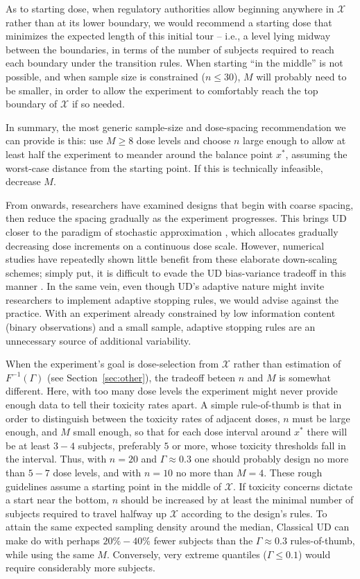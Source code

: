 As to starting dose, when regulatory authorities allow beginning anywhere in $\mathcal{X}$ rather than at its lower boundary, we would recommend a starting dose that minimizes the expected length of this initial tour -- i.e., a level lying midway between the boundaries, in terms of the number of subjects required to reach each boundary under the transition rules. When starting ``in the middle'' is not possible, and when sample size is constrained ($n\leq 30$), $M$ will probably need to be smaller, in order to allow the experiment to comfortably reach the top boundary of $\mathcal{X}$ if so needed.

In summary, the most generic sample-size and dose-spacing recommendation we can provide is this: use $M\geq 8$ dose levels and choose $n$ large enough to allow at least half the experiment to meander around the balance point $x^*$, assuming the worst-case distance from the starting point. If this is technically infeasible, decrease $M$.

From \cite{Weth:Sequ:1963} onwards, researchers have examined designs that begin with coarse spacing, then reduce the spacing gradually as the experiment progresses. This brings UD closer to the paradigm of stochastic approximation \citep{Robb:Monro:Asto:1951}, which allocates gradually decreasing dose increments on a continuous dose scale. However, numerical studies have repeatedly shown little benefit from these elaborate down-scaling schemes; simply put, it is difficult to evade the UD bias-variance tradeoff in this manner \citep{Garc:Pere:Forc:1998}. In the same vein, even though UD's adaptive nature might invite researchers to implement adaptive stopping rules, we would advise against the practice. With an experiment already constrained by low information content (binary observations) and a small sample, adaptive stopping rules are an unnecessary source of additional variability.

When the experiment's goal is dose-selection from $\mathcal{X}$ rather than estimation of $F^{-1}(\Gamma)$ (see Section~\ref{sec:other}), the tradeoff beteen $n$ and $M$ is somewhat different. Here, with too many dose levels the experiment might never provide enough data to tell their toxicity rates apart. A simple rule-of-thumb is that in order to distinguish between the toxicity rates of adjacent doses, $n$ must be large enough, and $M$ small enough, so that for each dose interval around $x^*$ there will be at least $3-4$ subjects, preferably $5$ or more, whose toxicity thresholds fall in the interval.  Thus, with $n=20$ and $\Gamma\approx 0.3$ one should probably design no more than $5-7$ dose levels, and with $n=10$ no more than $M=4$. These rough guidelines assume a starting point in the middle of $\mathcal{X}$. If toxicity concerns dictate a start near the bottom, $n$ should be increased by at least the minimal number of subjects required to travel halfway up $\mathcal{X}$ according to the design's rules. To attain the same expected sampling density around the median, Classical UD can make do with perhaps $20\%-40\%$ fewer subjects than the $\Gamma\approx 0.3$ rules-of-thumb, while using the same $M$. Conversely, very extreme quantiles ($\Gamma\leq 0.1$) would require considerably more subjects.

